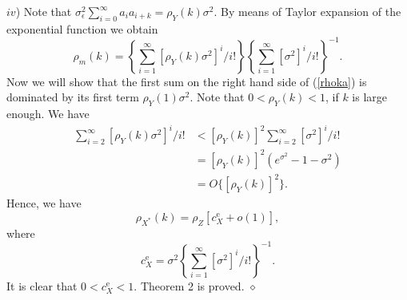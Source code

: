 \documentclass[12pt]{article}
\begin{document}
$iv$) Note that $\sigma_{\epsilon}^{2}\sum\limits_{i=0}^{\infty}a_{i}%
a_{i+k}=\rho_{Y}(k)\sigma^{2}$. By means of Taylor expansion of the
exponential function we obtain
\begin{equation}
\rho_m(k)=\left\{  \sum\limits_{i=1}^{\infty}[\rho_{Y}(k)\sigma^{2}%
]^{i}/i!\right\}  \left\{  \sum\limits_{i=1}^{\infty}[\sigma^{2}%
]^{i}/i!\right\}  ^{-1}. \label{rhoka}%
\end{equation}
Now we will show that the first sum on the right hand side of (\ref{rhoka}) is
dominated by its first term $\rho_{Y}(1)\sigma^{2}$. Note that $0<\rho
_{Y}(k)<1$, if $k$ is large enough. We have
\begin{align*}
\sum\limits_{i=2}^{\infty}[\rho_{Y}(k)\sigma^{2}]^{i}/i!  &  <[\rho
_{Y}(k)]^{2}\sum\limits_{i=2}^{\infty}[\sigma^{2}]^{i}/i!\\
&  =[\rho_{Y}(k)]^{2}(e^{\sigma^{2}}-1-\sigma^{2})\\
&  =O\{[\rho_{Y}(k)]^{2}\}.
\end{align*}
Hence, we have
\begin{equation}
\rho_{X^{\ast}}(k)=\rho_{Z}[c_{X}^{\mathrm{e}}+o(1)],
\end{equation}
where
\begin{equation}
c_{X}^{\mathrm{e}}=\sigma^{2}\left\{  \sum\limits_{i=1}^{\infty}[\sigma
^{2}]^{i}/i!\right\}  ^{-1}.
\end{equation}
It is clear that $0<c_{X}^{\mathrm{e}}<1$. Theorem 2 is proved. \hfill
$\diamond$
\end{document}
